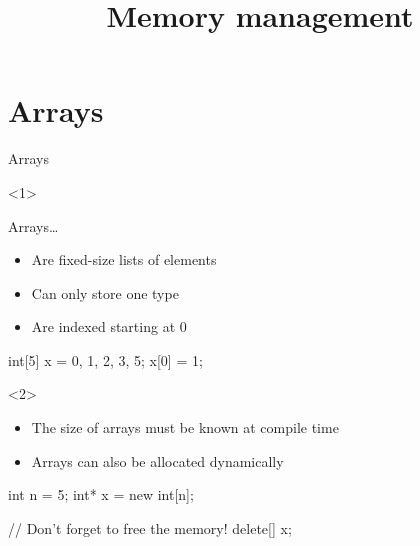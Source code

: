 

\title{Memory management}



\maketitle

\section{Arrays}

\begin{frame}[fragile]{Arrays}
    \begin{onlyenv}<1>
        \begin{block}{Arrays\ldots}
            \begin{itemize}
                \item Are \alert{fixed\hyp{}size} lists of elements
                \item Can only store one type
                \item Are indexed starting at 0
            \end{itemize}
        \end{block}
        \begin{cpp}
            int[5] x = {0, 1, 2, 3, 5};
            x[0] = 1;
        \end{cpp}
    \end{onlyenv}
    \begin{onlyenv}<2>
        \begin{itemize}
            \item The size of arrays must be known at compile time
            \item Arrays can also be \alert{allocated dynamically}
        \end{itemize}
        \begin{cpp}
            int n = 5;
            int* x = new int[n];

            // Don't forget to free the memory!
            delete[] x;
        \end{cpp}
    \end{onlyenv}
\end{frame}

